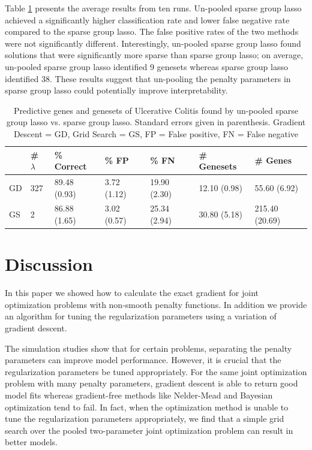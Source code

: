 \documentclass[12pt]{article}
\begin{document}
Table \ref{colitis} presents the average results from ten runs. Un-pooled sparse group lasso achieved a significantly higher classification rate and lower false negative rate compared to the sparse group lasso. The false positive rates of the two methods were not significantly different. Interestingly, un-pooled sparse group lasso found solutions that were significantly more sparse than sparse group lasso; on average, un-pooled sparse group lasso identified 9 genesets whereas sparse group lasso identified 38. These results suggest that un-pooling the penalty parameters in sparse group lasso could potentially improve interpretability.
\begin{table}
\caption{\label{colitis} Predictive genes and genesets of Ulcerative Colitis found by un-pooled sparse group lasso vs. sparse group lasso. Standard errors given in parenthesis. Gradient Descent = GD, Grid Search = GS, FP = False positive, FN = False negative}
\centering
\begin{tabular}{| l |l |l | l | l | l | l | }
\hline
& \# $\lambda$ & \% Correct  & \% FP & \% FN & \# Genesets & \# Genes  \\
\hline
GD & 327 & 89.48 (0.93) & 3.72 (1.12) & 19.90 (2.30) &  12.10 (0.98) & 55.60 (6.92) \\
\hline
GS & 2 & 86.88 (1.65) & 3.02 (0.57) & 25.34 (2.94)  & 30.80 (5.18) & 215.40 (20.69) \\
\hline
\end{tabular}
\end{table}

\section{Discussion}
In this paper we showed how to calculate the exact gradient for joint optimization problems with non-smooth penalty functions. In addition we provide an algorithm for tuning the regularization parameters using a variation of gradient descent. 

The simulation studies show that for certain problems, separating the penalty parameters can improve model performance. However, it is crucial that the regularization parameters be tuned appropriately. For the same joint optimization problem with many penalty parameters, gradient descent is able to return good model fits whereas gradient-free methods like Nelder-Mead and Bayesian optimization tend to fail. In fact, when the optimization method is unable to tune the regularization parameters appropriately, we find that a simple grid search over the pooled two-parameter joint optimization problem can result in better models.
\end{document}
